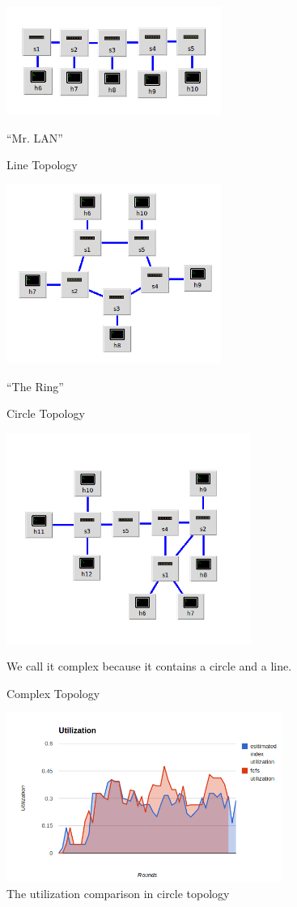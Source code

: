 \documentclass[a4paper,11pt,twocolumn]{article}
\begin{document}
\begin{figure}[ht!]
\centering
\includegraphics[width=70mm]{line.png}
\caption{Line Topology}
``Mr. LAN''
\label{overflow}
\end{figure}


\begin{figure}[ht!]
\centering
\includegraphics[width=70mm]{circle.png}
\caption{Circle Topology}
``The Ring''
\label{overflow}
\end{figure}


\begin{figure}[ht!]
\centering
\includegraphics[width=80mm]{mytopo.png}
\caption{Complex Topology}
We call it complex because it contains a circle and a line.
\label{overflow}
\end{figure}



\begin{figure}[ht!]
\centering
\includegraphics[width=90mm]{circle_utilization.png}
\caption{The utilization comparison in circle topology}
\label{overflow}
\end{figure}
\end{document}
